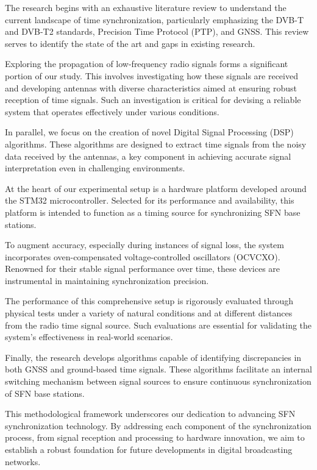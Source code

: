\documentclass[conference]{IEEEtran}
\begin{document}
The research begins with an exhaustive literature review to understand the
current landscape of time synchronization, particularly emphasizing the DVB-T
and DVB-T2 standards, Precision Time Protocol (PTP), and GNSS. This review serves to identify the state of the art
and gaps in existing research.

Exploring the propagation of low-frequency radio signals forms a significant
portion of our study. This involves investigating how these signals are
received and developing antennas with diverse characteristics aimed at ensuring
robust reception of time signals. Such an investigation is critical for
devising a reliable system that operates effectively under various conditions.

In parallel, we focus on the creation of novel Digital Signal Processing (DSP)
algorithms. These algorithms are designed to extract time signals from the
noisy data received by the antennas, a key component in achieving accurate
signal interpretation even in challenging environments.

At the heart of our experimental setup is a hardware platform developed around
the STM32 microcontroller. Selected for its performance and availability, this
platform is intended to function as a timing source for synchronizing SFN base stations.

To augment accuracy, especially during instances of signal loss, the system
incorporates oven-compensated voltage-controlled oscillators (OCVCXO). Renowned
for their stable signal performance over time, these devices are instrumental
in maintaining synchronization precision.

The performance of this comprehensive setup is rigorously evaluated through
physical tests under a variety of natural conditions and at different distances
from the radio time signal source. Such evaluations are essential for
validating the system's effectiveness in real-world scenarios.

Finally, the research develops algorithms capable of identifying discrepancies
in both GNSS and ground-based time signals. These algorithms facilitate an
internal switching mechanism between signal sources to ensure continuous
synchronization of SFN base stations.

This methodological framework underscores our dedication to advancing SFN
synchronization technology. By addressing each component of the synchronization
process, from signal reception and processing to hardware innovation, we aim to
establish a robust foundation for future developments in digital broadcasting
networks.
\end{document}
